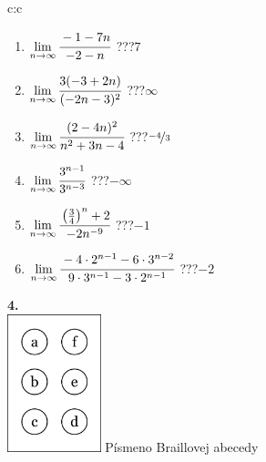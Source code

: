 \documentclass[10pt]{report}
\begin{document}
\begin{tabular}{c:c}
\begin{minipage}[c][104.5mm][t]{0.5\linewidth}
\begin{center}
\begin{minipage}{0.79\linewidth}
\begin{center}
\begin{varwidth}{\linewidth}
\begin{enumerate}
\normalsize
\item $\lim\limits_{n\to\infty}\cfrac{-1-7n}{-2-n}$\quad \dotfill\; ???\;\dotfill \quad $7$
\item $\lim\limits_{n\to\infty}\cfrac{3(-3+2n)}{(-2n-3)^2}$\quad \dotfill\; ???\;\dotfill \quad $\infty$
\item $\lim\limits_{n\to\infty}\cfrac{(2-4n)^2}{n^2+3n-4}$\quad \dotfill\; ???\;\dotfill \quad $\nicefrac{-4}{3}$
\item $\lim\limits_{n\to\infty}\cfrac{3^{n-1}}{3^{n-3}}$\quad \dotfill\; ???\;\dotfill \quad $-\infty$
\item $\lim\limits_{n\to\infty}\cfrac{\left(\frac{3}{4}\right)^n +2}{-2n^{-9}}$\quad \dotfill\; ???\;\dotfill \quad $-1$
\item $\lim\limits_{n\to\infty}\cfrac{-4\cdot 2^{n-1}-6\cdot 3^{n-2}}{9\cdot 3^{n-1}-3\cdot 2^{n-1}}$\quad \dotfill\; ???\;\dotfill \quad $-2$
\end{enumerate}
\end{varwidth}
\end{center}
\end{minipage}
\begin{minipage}{0.20\linewidth}
\begin{center}
{\Huge\bfseries 4.} \\[2mm]
\includegraphics[height=40mm]{../images/braille.png}
{\small Písmeno Braillovej abecedy}
\end{center}
\end{minipage}
\end{center}
\end{minipage}
%
\end{tabular}
\newpage
\thispagestyle{empty}
\end{document}
